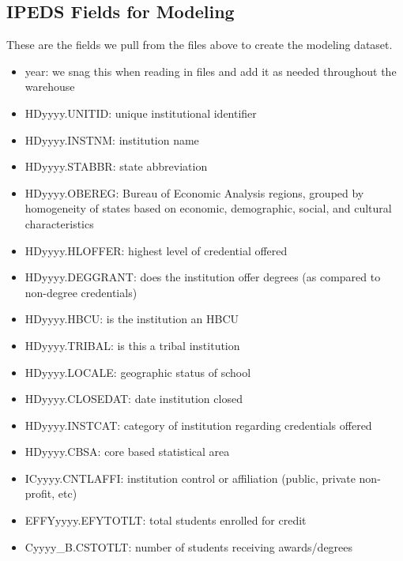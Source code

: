 \documentclass[sigconf, authorversion, nonacm]{acmart}
\begin{document}
    \subsection{IPEDS Fields for Modeling}
        These are the fields we pull from the files above to create the modeling dataset.

        \begin{itemize}
            \item year: we snag this when reading in files and add it as needed throughout the warehouse
            \item HDyyyy.UNITID: unique institutional identifier
            \item HDyyyy.INSTNM: institution name
            \item HDyyyy.STABBR: state abbreviation
            \item HDyyyy.OBEREG: Bureau of Economic Analysis regions, grouped by homogeneity of states based on economic, demographic, social, and cultural characteristics
            \item HDyyyy.HLOFFER: highest level of credential offered
            \item HDyyyy.DEGGRANT: does the institution offer degrees (as compared to non-degree credentials)
            \item HDyyyy.HBCU: is the institution an HBCU
            \item HDyyyy.TRIBAL: is this a tribal institution
            \item HDyyyy.LOCALE: geographic status of school
            \item HDyyyy.CLOSEDAT: date institution closed
            \item HDyyyy.INSTCAT: category of institution regarding credentials offered
            \item HDyyyy.CBSA: core based statistical area
            \item ICyyyy.CNTLAFFI: institution control or affiliation (public, private non-profit, etc)
            \item EFFYyyyy.EFYTOTLT: total students enrolled for credit
            \item Cyyyy_B.CSTOTLT: number of students receiving awards/degrees
        \end{itemize}
\end{document}
